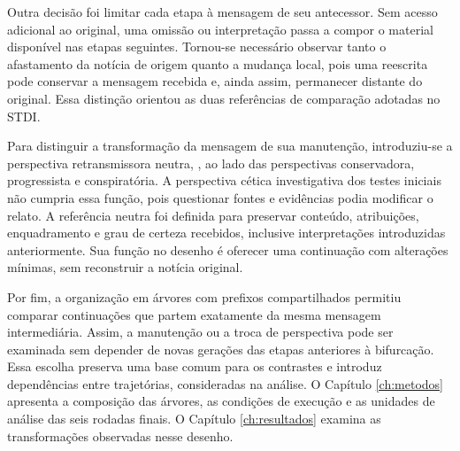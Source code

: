Outra decisão foi limitar cada etapa à mensagem de seu antecessor. Sem acesso adicional ao original, uma omissão ou interpretação passa a compor o material disponível nas etapas seguintes. Tornou-se necessário observar tanto o afastamento da notícia de origem quanto a mudança local, pois uma reescrita pode conservar a mensagem recebida e, ainda assim, permanecer distante do original. Essa distinção orientou as duas referências de comparação adotadas no STDI.

Para distinguir a transformação da mensagem de sua manutenção, introduziu-se a perspectiva retransmissora neutra, , ao lado das perspectivas conservadora, progressista e conspiratória. A perspectiva cética investigativa dos testes iniciais não cumpria essa função, pois questionar fontes e evidências podia modificar o relato. A referência neutra foi definida para preservar conteúdo, atribuições, enquadramento e grau de certeza recebidos, inclusive interpretações introduzidas anteriormente. Sua função no desenho é oferecer uma continuação com alterações mínimas, sem reconstruir a notícia original.

Por fim, a organização em árvores com prefixos compartilhados permitiu comparar continuações que partem exatamente da mesma mensagem intermediária. Assim, a manutenção ou a troca de perspectiva pode ser examinada sem depender de novas gerações das etapas anteriores à bifurcação. Essa escolha preserva uma base comum para os contrastes e introduz dependências entre trajetórias, consideradas na análise. O Capítulo \ref{ch:metodos} apresenta a composição das árvores, as condições de execução e as unidades de análise das seis rodadas finais. O Capítulo \ref{ch:resultados} examina as transformações observadas nesse desenho.
